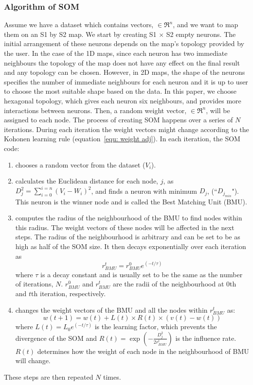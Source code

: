  \subsubsection{Algorithm of SOM} 
 \label{sec: algorithm}
     Assume we have a dataset which contains vectors,  $\in \Re^n$, and we want to map them on an S1 by S2 map. 
     We start by creating S1 $\times$ S2 empty neurons. 
     The initial arrangement of these neurons depends on the map's topology provided by the user.
     In the case of the 1D maps, since each neuron has two immediate neighbours the topology of the map does not have any effect on the final result and any topology can be chosen.
     However, in 2D maps, the shape of the neurons specifies the number of immediate neighbours for each neuron and it is up to user to choose the most suitable shape based on the data.
     In this paper, we choose hexagonal topology, which gives each neuron six neighbours, and provides more interactions between neurons.
     Then, a random weight vector,  $\in \Re^n$, will be assigned to each node.
     The process of creating SOM happens over a series of $N$ iterations. 
     During each iteration the weight vectors might change according to the Kohonen learning rule (equation~\ref{equ: weight adj}). 
      In each iteration, the SOM code:
     \begin{enumerate}
        \item chooses a random vector from the dataset ($V_i$).
        \item calculates the Euclidean distance for each node, $j$, as  $D_j^2= \sum_{i=0}^{i=n} (V_i - W_i)^2$, and finds a neuron with minimum $D_j$, (``$D_{j_{min}}$"). This neuron is the winner node and is called the Best Matching Unit (BMU). 
        \item  computes the radius of the neighbourhood of the BMU to find nodes within this radius. The weight vectors of these nodes will be affected in the next steps. The radius of the neighbourhood is arbitrary and can be set to be as high as half of the SOM size. It then decays exponentially over each iteration as
        \begin{equation}
            r^t_{BMU} = r^0_{BMU}e^{(-t/\tau)}
        \end{equation}
        where $\tau$ is a decay constant and is usually set to be the same as the number of iterations, $N$. $r^0_{BMU}$ and $r^t_{BMU}$ are the radii of the neighbourhood at 0th and $t$th iteration, respectively. 
        \item changes the weight vectors of the BMU and all the nodes within $r^t_{BMU}$ as:
        \begin{equation}
            \label{equ: weight adj}
            w(t+1)=w(t)+L(t) \times R(t) \times(v(t)-w(t))
        \end{equation}
        where $L(t) = L_0 e^{(-t/\tau)}$ is the learning factor, which prevents the divergence of the SOM and $R(t)=\exp(-\frac{D_j^2}{2r^t_{BMU}})$ is the influence rate. $R(t)$ determines how the weight of each node in the neighbourhood of BMU will change.
     \end{enumerate}
     These steps are then repeated $N$ times.
     
